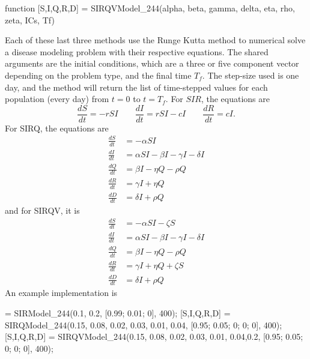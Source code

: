 \begin{matlab}
function [S,I,Q,R,D] = SIRQVModel_244(alpha, beta, gamma, delta, eta, rho, zeta, ICs, Tf)
%
\end{matlab}

Each of these last three methods use the Runge Kutta method to numerical solve a disease modeling problem with their respective equations. The shared arguments are the initial conditions, which are a three or five component vector depending on the problem type, and the final time $T_f$. The step-size used is one day, and the method will return the list of time-stepped values for each population (every day) from $t=0$ to $t=T_f$. For $SIR$, the equations are
\[ \frac{dS}{dt} = - rSI \qquad \frac{dI}{dt} = rSI - cI \qquad \frac{dR}{dt} = cI.  \] For SIRQ, the equations are
\[
    \begin{split}
        \frac{dS}{dt} &= -\alpha SI \\
        \frac{dI}{dt} &= \alpha SI - \beta I - \gamma I - \delta I \\
        \frac{dQ}{dt} &= \beta I - \eta Q - \rho Q \\
        \frac{dR}{dt} &= \gamma I + \eta Q \\
        \frac{dD}{dt} &= \delta I + \rho Q
    \end{split}
\] 
and for SIRQV, it is
\[
    \begin{split}
        \frac{dS}{dt} &= -\alpha SI- \zeta S \\
        \frac{dI}{dt} &= \alpha SI - \beta I - \gamma I - \delta I \\
        \frac{dQ}{dt} &= \beta I - \eta Q - \rho Q \\
        \frac{dR}{dt} &= \gamma I + \eta Q  + \zeta S\\
        \frac{dD}{dt} &= \delta I + \rho Q
    \end{split}
\] 
An example implementation is

\begin{matlab}
[S,I,R] = SIRModel_244(0.1, 0.2, [0.99; 0.01; 0], 400);
[S,I,Q,R,D] = SIRQModel_244(0.15, 0.08, 0.02, 0.03, 0.01, 0.04, [0.95; 0.05; 0; 0; 0], 400);
[S,I,Q,R,D] = SIRQVModel_244(0.15, 0.08, 0.02, 0.03, 0.01, 0.04,0.2, [0.95; 0.05; 0; 0; 0], 400);
\end{matlab}